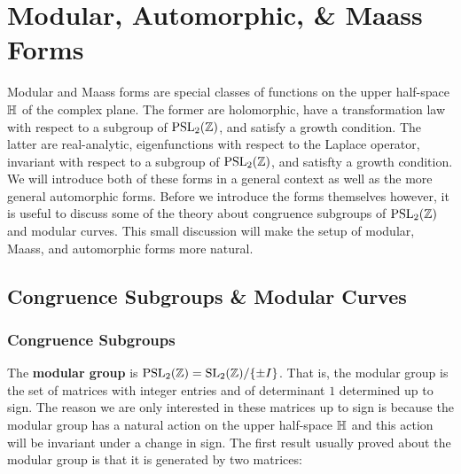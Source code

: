 \chapter{Modular, Automorphic, \& Maass Forms}\label{ch:Modular_Maass_Automorphic_forms}
  Modular and Maass forms are special classes of functions on the upper half-space $\mathbb{H}$ of the complex plane. The former are holomorphic, have a transformation law with respect to a subgroup of $\mathrm{PSL}_{2}(\mathbb{Z})$, and satisfy a growth condition. The latter are real-analytic, eigenfunctions with respect to the Laplace operator, invariant with respect to a subgroup of $\mathrm{PSL}_{2}(\mathbb{Z})$, and satisfty a growth condition. We will introduce both of these forms in a general context as well as the more general automorphic forms. Before we introduce the forms themselves however, it is useful to discuss some of the theory about congruence subgroups of $\mathrm{PSL}_{2}(\mathbb{Z})$ and modular curves. This small discussion will make the setup of modular, Maass, and automorphic forms more natural.
  \section{Congruence Subgroups \& Modular Curves}
    \subsection*{Congruence Subgroups}
      The \textbf{modular group} is $\mathrm{PSL}_{2}(\mathbb{Z}) = \mathrm{SL}_{2}(\mathbb{Z})/\{\pm I\}$. That is, the modular group is the set of matrices with integer entries and of determinant $1$ determined up to sign. The reason we are only interested in these matrices up to sign is because the modular group has a natural action on the upper half-space $\mathbb{H}$ and this action will be invariant under a change in sign. The first result usually proved about the modular group is that it is generated by two matrices:

